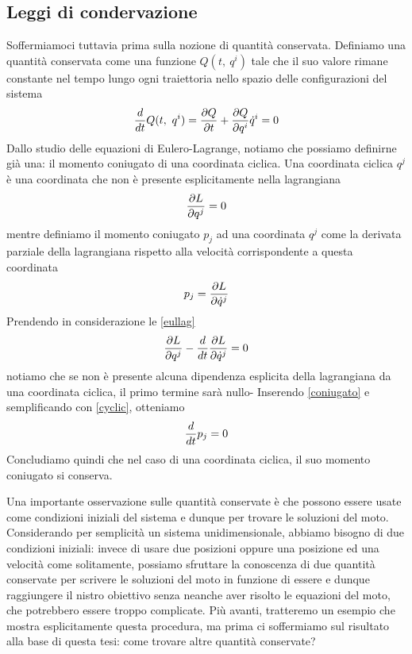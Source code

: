 \subsection{Leggi di condervazione}
    Soffermiamoci tuttavia prima sulla nozione di quantità conservata. Definiamo una quantità conservata come una funzione $Q(t, ~q^i)$ tale che il suo valore rimane constante nel tempo lungo ogni traiettoria nello spazio delle configurazioni del sistema
\begin{equation*}
    \frac{d}{dt} Q(t, ~q^i) = \frac{\partial Q}{\partial t} + \frac{\partial Q}{\partial q^i} \dot q^i = 0
\end{equation*}
    Dallo studio delle equazioni di Eulero-Lagrange, notiamo che possiamo definirne già una: il momento coniugato di una coordinata ciclica. Una coordinata ciclica $q^j$ è una coordinata che non è presente esplicitamente nella lagrangiana
\begin{equation} \label{cyclic}
    \frac{\partial L}{\partial q^j} = 0
\end{equation}
    mentre definiamo il momento coniugato $p_j$ ad una coordinata $q^j$ come la derivata parziale della lagrangiana rispetto alla velocità corrispondente a questa coordinata
\begin{equation} \label{coniugato}
    p_j = \frac{\partial L}{\partial\dot q^j}
\end{equation}
    Prendendo in considerazione le \eqref{eullag}
\begin{equation*}
    \frac{\partial L}{\partial q^j}  - \frac{d}{dt} \frac{\partial L}{\partial\dot q^j} = 0
\end{equation*}
    notiamo che se non è presente alcuna dipendenza esplicita della lagrangiana da una coordinata ciclica, il primo termine sarà nullo- Inserendo \eqref{coniugato} e semplificando con \eqref{cyclic}, otteniamo
\begin{equation*}
    \frac{d}{dt} p_j = 0
\end{equation*}
    Concludiamo quindi che nel caso di una coordinata ciclica, il suo momento coniugato si conserva. 

    Una importante osservazione sulle quantità conservate è che possono essere usate come condizioni iniziali del sistema e dunque per trovare le soluzioni del moto. Considerando per semplicità un sistema unidimensionale, abbiamo bisogno di due condizioni iniziali: invece di usare due posizioni oppure una posizione ed una velocità come solitamente, possiamo sfruttare la conoscenza di due quantità conservate per scrivere le soluzioni del moto in funzione di essere e dunque raggiungere il nistro obiettivo senza neanche aver risolto le equazioni del moto, che potrebbero essere troppo complicate. Più avanti, tratteremo un esempio che mostra esplicitamente questa procedura, ma prima ci soffermiamo sul risultato alla base di questa tesi: come trovare altre quantità conservate?

